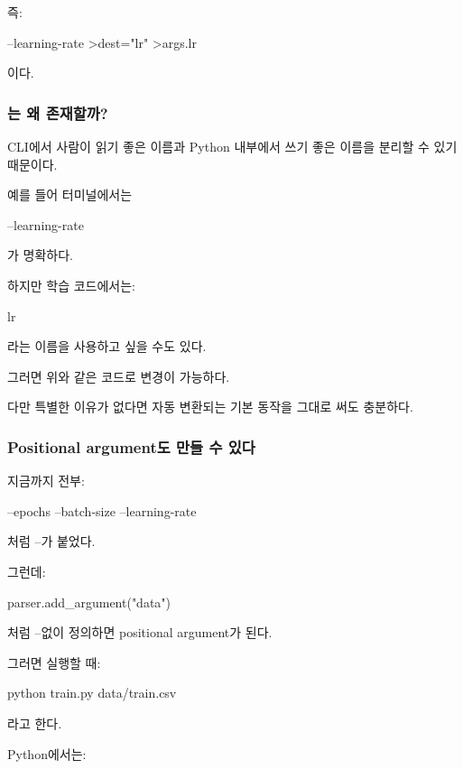 즉:

\begin{dhkdir}
--learning-rate
>dest="lr"
>args.lr
\end{dhkdir}

이다.

\subsubsection{는 왜 존재할까?}

CLI에서 사람이 읽기 좋은 이름과 Python 내부에서 쓰기 좋은 이름을 분리할 수 있기 때문이다.

예를 들어 터미널에서는

\begin{dhkzsh}
--learning-rate
\end{dhkzsh}

가 명확하다.

하지만 학습 코드에서는:

\begin{dhkzsh}
lr
\end{dhkzsh}

라는 이름을 사용하고 싶을 수도 있다.

그러면 위와 같은 코드로 변경이 가능하다.

다만 특별한 이유가 없다면 자동 변환되는 기본 동작을 그대로 써도 충분하다.

\subsubsection{Positional argument도 만들 수 있다}

지금까지 전부:

\begin{dhkzsh}
--epochs
--batch-size
--learning-rate
\end{dhkzsh}

처럼 --가 붙었다.

그런데:

\begin{dhkcode}
parser.add_argument("data")
\end{dhkcode}

처럼 --없이 정의하면 positional argument가 된다.

그러면 실행할 때:

\begin{dhkzsh}
python train.py data/train.csv
\end{dhkzsh}

라고 한다.

Python에서는:

